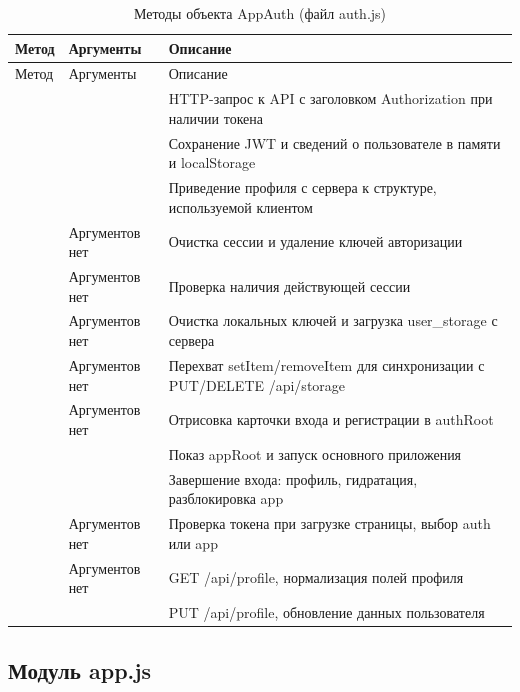 \begin{xltabular}{\textwidth}{|P{4.4cm}|P{3.4cm}|X|}
	\caption{Методы объекта AppAuth (файл auth.js)\label{tab:rp-auth}}\\
	\hline \centrow Метод & \centrow Аргументы & \centrow Описание \\ \hline
	\endfirsthead
	\centrow Метод & \centrow Аргументы & \centrow Описание \\ \hline
	\finishhead
	 &  & HTTP-запрос к API с заголовком Authorization при наличии токена \\ \hline
	 &  & Сохранение JWT и сведений о пользователе в памяти и localStorage \\ \hline
	 &  & Приведение профиля с сервера к структуре, используемой клиентом \\ \hline
	 & Аргументов нет & Очистка сессии и удаление ключей авторизации \\ \hline
	 & Аргументов нет & Проверка наличия действующей сессии \\ \hline
	 & Аргументов нет & Очистка локальных ключей и загрузка user\_storage с сервера \\ \hline
	 & Аргументов нет & Перехват setItem/removeItem для синхронизации с PUT/DELETE /api/storage \\ \hline
	 & Аргументов нет & Отрисовка карточки входа и регистрации в authRoot \\ \hline
	 &  & Показ appRoot и запуск основного приложения \\ \hline
	 &  & Завершение входа: профиль, гидратация, разблокировка app \\ \hline
	 & Аргументов нет & Проверка токена при загрузке страницы, выбор auth или app \\ \hline
	 & Аргументов нет & GET /api/profile, нормализация полей профиля \\ \hline
	 &  & PUT /api/profile, обновление данных пользователя \\ \hline
\end{xltabular}

\subsection{Модуль app.js}

